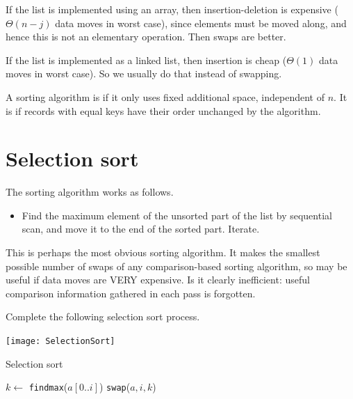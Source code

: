 If the list is implemented using an array, then insertion-deletion is expensive ($\Theta(n-j)$ data moves in worst case), 
since elements must be moved along, and hence this is not an elementary operation. Then swaps are better.

If the list is implemented as a linked list, then insertion is cheap ($\Theta(1)$ data moves in worst case).
So we usually do that instead of swapping.
	

\begin{Definition}
A sorting algorithm is  if it only uses fixed additional space, independent of $n$.
It is  if records with equal keys have their order unchanged by the algorithm.
\end{Definition}



\section{Selection sort} %
\label{sec:selectionsort}
The sorting algorithm  works as follows.
\begin{itemize} 
	\item Find the maximum element of the unsorted part of the list by sequential 
	scan, and move it to the end of the sorted part. Iterate.
	\end{itemize}
This is perhaps the most obvious sorting algorithm.
It makes the smallest possible number of swaps of any comparison-based sorting algorithm, 
	so may be useful if data moves are VERY expensive.
Is it clearly inefficient: useful comparison information gathered in each 
	pass is forgotten.


\begin{Boxample}[0]
Complete the following selection sort process.
\begin{center}
\texttt{[image: SelectionSort]}
\end{center}
\end{Boxample}

\begin{algorithm}[H]
  \caption{Selection sort
    \label{alg:selsort}}
\begin{algorithmic}[1]
	\State $k \gets $ \texttt{findmax}($a[0..i]$)
		\State \texttt{swap}($a,i,k$)
	\EndIf
\EndFor
\State {}
\EndFunction
\end{algorithmic}
\end{algorithm}

